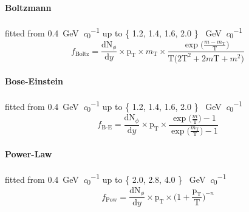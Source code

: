 \paragraph{Boltzmann} fitted from \SI{0.4}{\giga\electronvolt\per\clight} up to \{ 1.2, 1.4, 1.6, 2.0 \} \SI{}{\giga\electronvolt\per\clight}
\begin{equation}
f_{\text{Boltz}} = \frac{\text{dN}_{\phi}}{\text{d}y}\times\text{p}_{\text{T}}\times m_{\text{T}}\times\frac{\exp\Big(\frac{m-m_{\text{T}}}{\text{T}} \Big)}{\text{T}\Big( 2\text{T}^2 + 2m\text{T} + m^2 \Big)}
\label{eq:boltz}
\end{equation}

\paragraph{Bose-Einstein} fitted from \SI{0.4}{\giga\electronvolt\per\clight} up to \{ 1.2, 1.4, 1.6, 2.0 \} \SI{}{\giga\electronvolt\per\clight}
\begin{equation}
f_{\text{B-E}} = \frac{\text{dN}_{\phi}}{\text{d}y}\times\text{p}_{\text{T}}\times\frac{\exp\Big(\frac{m}{\text{T}} \Big)-1}{\exp\Big(\frac{m_{\text{T}}}{\text{T}} \Big)-1}
\label{eq:bosein}
\end{equation}

\paragraph{Power-Law} fitted from \SI{0.4}{\giga\electronvolt\per\clight} up to \{ 2.0, 2.8, 4.0 \} \SI{}{\giga\electronvolt\per\clight}
\begin{equation}
f_{\text{Pow}} = \frac{\text{dN}_{\phi}}{\text{d}y}\times\text{p}_{\text{T}}\times\Big( 1 + \frac{\text{p}_{\text{T}}}{\text{T}} \Big)^{-n}
\label{eq:pow}
\end{equation}